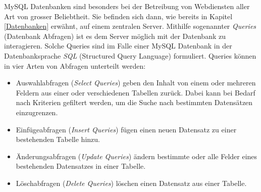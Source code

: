 \documentclass[../main.tex]{subfiles}
\begin{document}
	MySQL Datenbanken sind besonders bei der Betreibung von Webdiensten aller Art von grosser Beliebtheit. Sie befinden sich dann, wie bereits in Kapitel \ref{Datenbanken} erwähnt, auf einem zentralen Server. Mithilfe sogenannter \emph{Queries} (Datenbank Abfragen) ist es dem Server möglich mit der Datenbank zu interagieren. Solche Queries sind im Falle einer MySQL Datenbank in der Datenbanksprache \emph{SQL} (Structured Query Language) formuliert. Queries können in vier Arten von Abfragen unterteilt werden: \cite[S. 760]{IT-Handbuch}
	
	\begin{itemize}
		\item Auswahlabfragen (\emph{Select Queries}) geben den Inhalt von einem oder mehreren Feldern aus einer oder verschiedenen Tabellen zurück. Dabei kann bei Bedarf nach Kriterien gefiltert werden, um die Suche nach bestimmten Datensätzen einzugrenzen.\cite[S. 746]{IT-Handbuch}
		\item Einfügeabfragen (\emph{Insert Queries}) fügen einen neuen Datensatz zu einer bestehenden Tabelle hinzu. \cite[S. 746]{IT-Handbuch}
		\item Änderungsabfragen (\emph{Update Queries}) ändern bestimmte oder alle Felder eines bestehenden Datensatzes in einer Tabelle. \cite[S. 746]{IT-Handbuch}
		\item Löschabfragen (\emph{Delete Queries}) löschen einen Datensatz aus einer Tabelle. \cite[S. 746]{IT-Handbuch}
	\end{itemize}
	
\end{document}
